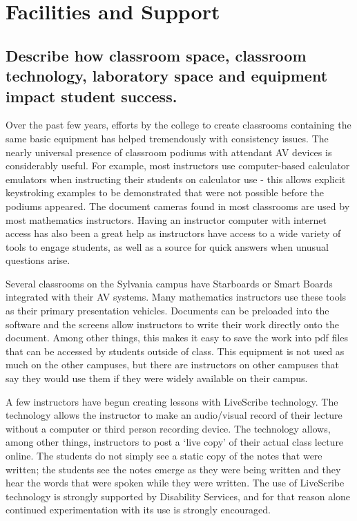 \chapter{Facilities and Support}
\section{Describe how classroom space, classroom technology, laboratory space and equipment impact student success.}

Over the past few years, efforts by the college to create classrooms containing the same basic equipment has helped tremendously with consistency issues.  The nearly universal presence of classroom podiums with attendant AV devices is considerably useful.  For example, most instructors use computer-based calculator emulators when instructing their students on calculator use - this allows explicit keystroking examples to be demonstrated that were not possible before the podiums appeared.  The document cameras found in most classrooms are used by most mathematics instructors.     Having an instructor computer with internet access has also been a great help as instructors have access to a wide variety of tools to engage students, as well as a source for quick answers when unusual questions arise.  

Several classrooms on the Sylvania campus have Starboards  or Smart Boards integrated with their AV systems.  Many mathematics instructors use these tools as their primary presentation vehicles.  Documents can be preloaded into the software and the screens allow instructors to write their work directly onto the document.  Among other things, this makes it easy to save the work into pdf files that can be accessed by students outside of class.  This equipment is not used as much on the other campuses, but there are instructors on other campuses that say they would use them if they were widely available on their campus.

A few instructors have begun creating lessons with LiveScribe technology.  The technology allows the instructor to make an audio/visual record of their lecture without a computer or third person recording device.  The technology allows, among other things, instructors to post a `live copy' of their actual class lecture online.  The students  do not simply see a static copy of the notes that were written;  the students see the notes emerge as they were being written and they hear the words that were spoken while they were written.  The use of LiveScribe technology is strongly supported by Disability Services, and for that reason alone continued experimentation with its use is strongly encouraged.

